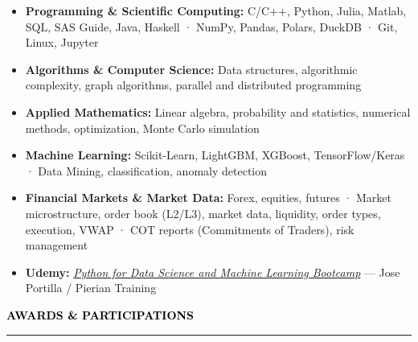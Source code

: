 \documentclass[10pt,english,french]{article}
\newcommand{\awardIcon}[1][black]{\textcolor{#1}{\faTrophy}}
\newcommand{\cvsection}[1]{
    \vspace{4pt}
    \textbf{\fontsize{9pt}{10pt}\selectfont \textcolor{black}{#1}}
    \vspace{6pt}
    \hrule
    \vspace{6pt}
}
\begin{document}
\vspace{-4pt}
\begin{itemize}[leftmargin=0.5cm, label=\textbullet, itemsep=0.12em]

    \item \textbf{Programming \& Scientific Computing\!:}
          C/C++, Python, Julia, Matlab, SQL, SAS Guide, Java, Haskell ·
          NumPy, Pandas, Polars, DuckDB ·
          Git, Linux, Jupyter

    \item \textbf{Algorithms \& Computer Science\!:}
          Data structures, algorithmic complexity,
          graph algorithms, parallel and distributed programming

    \item \textbf{Applied Mathematics\!:}
          Linear algebra, probability and statistics, numerical methods, optimization, Monte Carlo simulation

    \item \textbf{Machine Learning\!:}
          Scikit-Learn, LightGBM, XGBoost, TensorFlow/Keras ·
          Data Mining, classification, anomaly detection

    \item \textbf{Financial Markets \& Market Data\!:}
          Forex, equities, futures ·
          Market microstructure, order book (L2/L3), market data,
          liquidity, order types, execution, VWAP ·
          COT reports (Commitments of Traders), risk management


    \item \textbf{Udemy\!:}
          \href{https://www.udemy.com/certificate/UC-51319000-ccb8-4c9c-9320-6cd9860e601c/}
          {\textit{Python for Data Science and Machine Learning Bootcamp}}
          --- Jose Portilla / Pierian Training
\end{itemize}

\vspace{-3pt}
\cvsection{\awardIcon[black]\hspace{4pt}AWARDS \& PARTICIPATIONS}
\end{document}
